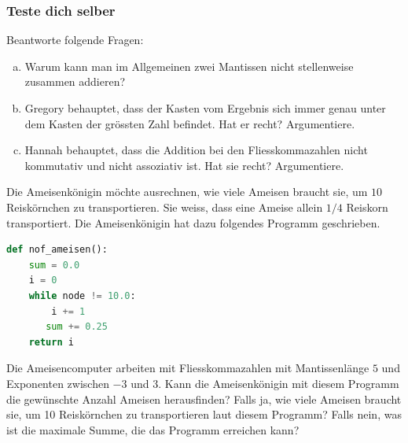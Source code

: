\subsubsection*{\textcolor{blue-violet}{Teste dich selber}}
\begin{aufgabe}\label{addition_kontrollfragen}
Beantworte folgende Fragen:
\begin{enumerate}[(a)]
\item Warum kann man im Allgemeinen zwei Mantissen nicht stellenweise zusammen addieren?
\item Gregory behauptet, dass der Kasten vom Ergebnis sich immer genau unter dem Kasten der grössten Zahl befindet. Hat er recht? Argumentiere.
\item Hannah behauptet, dass die Addition bei den Fliesskommazahlen nicht kommutativ und nicht assoziativ ist. Hat sie recht? Argumentiere.
\end{enumerate}
\end{aufgabe}

\begin{aufgabe}\label{ameisenkönigin}
Die Ameisenkönigin möchte ausrechnen, wie viele Ameisen braucht sie, um \(10\) Reiskörnchen zu transportieren. Sie weiss, dass eine Ameise allein \(1/4\) Reiskorn transportiert. Die Ameisenkönigin hat dazu folgendes Programm geschrieben.
\begin{lstlisting}[language=Python, caption={Programm von der Ameisenkönigin}]
def nof_ameisen():
    sum = 0.0
    i = 0
    while node != 10.0:
    	i += 1
       sum += 0.25
    return i
\end{lstlisting}
Die Ameisencomputer arbeiten mit Fliesskommazahlen mit Mantissenlänge \(5\) und Exponenten zwischen \(-3\) und \(3\).
Kann die Ameisenkönigin mit diesem Programm die gewünschte Anzahl Ameisen herausfinden? Falls ja, wie viele Ameisen braucht sie, um 10 Reiskörnchen zu transportieren laut diesem Programm? Falls nein, was ist die maximale Summe, die das Programm erreichen kann?
\end{aufgabe}
